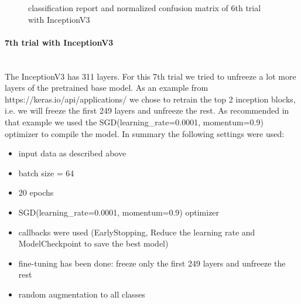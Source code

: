 \documentclass{article}
\begin{document}
\begin{figure}%
  \centering
  \qquad
  \caption{classification report and normalized confusion matrix of 6th trial with InceptionV3}
  \label{fig:inceptionv3_09_results}
\end{figure}

\paragraph{7th trial with InceptionV3}\mbox{}\\

The InceptionV3 has 311 layers. For this 7th trial we tried to unfreeze a lot more layers of the pretrained base model. As an example from https://keras.io/api/applications/ we chose to retrain the top 2 inception blocks, i.e. we will freeze the first 249 layers and unfreeze the rest. As recommended in that example we used the SGD(learning\_rate=0.0001, momentum=0.9) optimizer to compile the model. In summary the following settings were used: 
\begin{itemize}
\item input data as described above
\item batch size = 64
\item 20 epochs 
\item SGD(learning\_rate=0.0001, momentum=0.9) optimizer
\item callbacks were used (EarlyStopping, Reduce the learning rate and ModelCheckpoint to save the best model)
\item fine-tuning has been done: freeze only the first 249 layers and unfreeze the rest
\item random augmentation to all classes 
\end{itemize}
\end{document}
